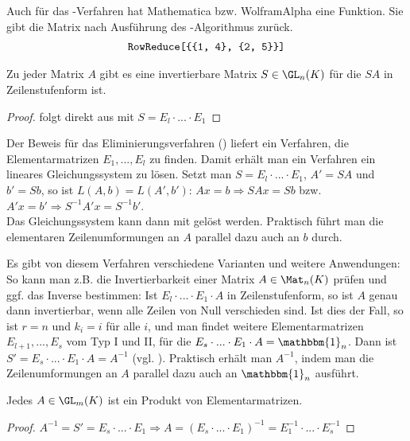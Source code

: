 \begin{mathematica}
	Auch für das -Verfahren hat Mathematica bzw. WolframAlpha eine Funktion. Sie gibt die Matrix nach Ausführung des -Algorithmus zurück.
	\begin{align}
		\texttt{RowReduce[\{\{1, 4\}, \{2, 5\}\}]}\notag
	\end{align}
\end{mathematica}

\begin{conclusion}
	Zu jeder Matrix $A$ gibt es eine invertierbare Matrix $S\in \GL_n(K)$ für die $SA$ in Zeilenstufenform ist.
\end{conclusion}
\begin{proof}
	folgt direkt aus  mit $S=E_l\cdot ... \cdot E_1$
\end{proof}

\begin{remark}
	Der Beweis für das Eliminierungsverfahren () liefert ein Verfahren, die Elementarmatrizen $E_1,...,E_l$ zu finden. 
	Damit erhält man ein Verfahren ein lineares Gleichungssystem zu lösen. Setzt man $S=E_l\cdot ... \cdot E_1$, $A'=SA$ und $b'=Sb$, so 
	ist $L(A,b)=L(A',b')$: $Ax=b\Rightarrow SAx=Sb$ bzw. $A'x=b' \Rightarrow S^{-1}A'x=S^{-1}b'$. \\
	Das Gleichungssystem kann dann mit  gelöst werden. Praktisch führt man die elementaren Zeilenumformungen an $A$ parallel dazu auch an $b$ 
	durch.
\end{remark}

\begin{remark}
	Es gibt von diesem Verfahren verschiedene Varianten und weitere Anwendungen: So kann man z.B. die Invertierbarkeit 
	einer Matrix $A\in \Mat_n(K)$ prüfen und ggf. das Inverse bestimmen: Ist $E_l\cdot ... \cdot E_1\cdot A$ in Zeilenstufenform, so ist $A$ 
	genau dann invertierbar, wenn alle Zeilen von Null verschieden sind. Ist dies der Fall, so ist $r=n$ und $k_i=i$ für alle $i$, 
	und man findet weitere Elementarmatrizen $E_{l+1},...,E_s$ vom Typ I und II, für die $E_s\cdot ... \cdot E_1\cdot A=\mathbbm{1}_n$. Dann ist 
	$S'=E_s\cdot ... \cdot E_1\cdot A=A^{-1}$ (vgl. ). Praktisch erhält man $A^{-1}$, indem man die Zeilenumformungen an $A$ parallel dazu 
	auch an $\mathbbm{1}_n$ ausführt.
\end{remark}

\begin{conclusion}
	Jedes $A\in \GL_m(K)$ ist ein Produkt von Elementarmatrizen.
\end{conclusion}
\begin{proof}
	$A^{-1}=S'=E_s\cdot ... \cdot E_1 \Rightarrow A=(E_s\cdot ... \cdot E_1)^{-1}=E_1^{-1}\cdot ... \cdot E_s^{-1}$
\end{proof}